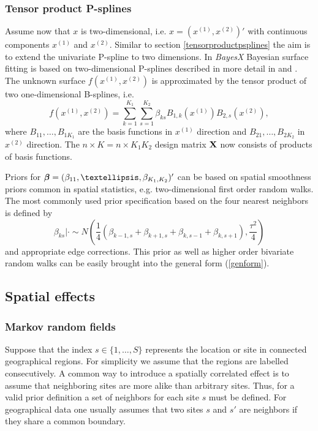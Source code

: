 \documentclass[11pt,a4paper,twoside]{bayesxarticle}
\begin{document}
\subsubsection{Tensor product P-splines}
\label{tensorproductpsplines_bayes}

Assume now that $x$ is two-dimensional, i.e. $x = \left(x^{(1)},x^{(2)}\right)'$ with continuous components $x^{(1)}$ and
$x^{(2)}$. Similar to section \ref{tensorproductpsplines} the aim is to extend the univariate P-spline to two dimensions. In
{\em BayesX} Bayesian surface fitting is based on two-dimensional P-splines described in more detail in 
and . The unknown surface $f(x^{(1)},x^{(2)})$ is approximated by the tensor product of two
one-dimensional B-splines, i.e.
$$
f\left(x^{(1)},x^{(2)}\right) = \sum_{k=1}^{K_1}
\sum_{s=1}^{K_2} \beta_{ks} B_{1,k}(x^{(1)})
B_{2,s} (x^{(2)}),
$$
where $B_{11},\dots,B_{1K_1}$ are the basis functions in $x^{(1)}$ direction and
$B_{21},\dots,B_{2K_2}$ in $x^{(2)}$ direction.
The $n \times K = n \times K_1 K_2$ design matrix $\mathbf{X}$ now consists of
products of basis functions.

Priors for
$\betavec = (\beta_{11},\dots,\beta_{K_1,K_2})'$ can be based on
spatial smoothness priors common in spatial statistics, e.g.
two-dimensional first order random walks. The most commonly used
prior specification based on the four nearest neighbors is defined
by
\begin{equation}
\label{2dimrw1} \beta_{ks} | \cdot \sim N \left(
\frac{1}{4} ( \beta_{k-1,s}+ \beta_{k+1,s} +
\beta_{k,s-1} +\beta_{k,s+1}),\frac{\tau^2}{4}
\right)
\end{equation}
and appropriate edge corrections. This
prior as well as higher order bivariate random walks can be easily
brought into the general form (\ref{genform}).


\subsection{Spatial effects} \label{spatial}

\subsubsection{Markov random fields}

Suppose that the index $s \in \{ 1,\dots,S \}$ represents the
location or site in connected geographical regions. For simplicity
we assume that the regions are labelled consecutively. A common way
to introduce a spatially correlated effect is to assume that
neighboring sites are more alike than arbitrary sites. Thus, for a
valid prior definition a set of neighbors for each site $s$ must be
defined. For geographical data one usually assumes that two sites
$s$ and $s'$ are neighbors if they share a common boundary.
\end{document}
